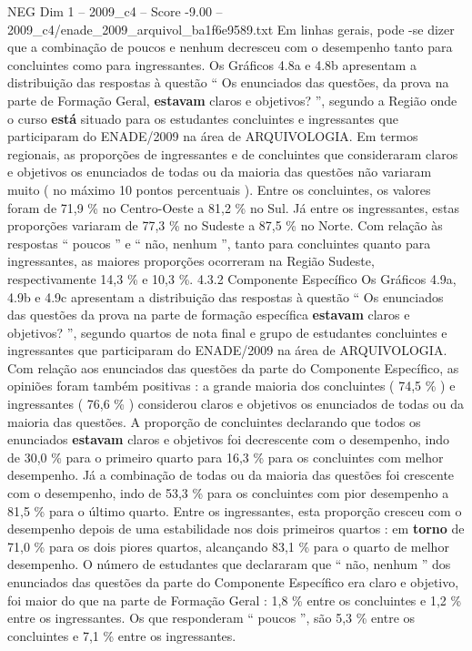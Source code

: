 \begin{textsample}{NEG Dim 1 – 2009\_c4 – Score -9.00 – 2009\_c4/enade\_2009\_arquivol\_ba1f6e9589.txt}
Em linhas gerais, pode -se dizer que a combinação de poucos e nenhum decresceu com o desempenho tanto para concluintes como para ingressantes.
Os Gráficos 4.8a e 4.8b apresentam a distribuição das respostas à questão “ Os enunciados das questões, da prova na parte de Formação Geral, \textbf{estavam} claros e objetivos? ”, segundo a Região onde o curso \textbf{está} situado para os estudantes concluintes e ingressantes que participaram do ENADE/2009 na área de ARQUIVOLOGIA.
Em termos regionais, as proporções de ingressantes e de concluintes que consideraram claros e objetivos os enunciados de todas ou da maioria das questões não variaram muito ( no máximo 10 pontos percentuais ).
Entre os concluintes, os valores foram de 71,9 \% no Centro-Oeste a 81,2 \% no Sul.
Já entre os ingressantes, estas proporções variaram de 77,3 \% no Sudeste a 87,5 \% no Norte.
Com relação às respostas “ poucos ” e “ não, nenhum ”, tanto para concluintes quanto para ingressantes, as maiores proporções ocorreram na Região Sudeste, respectivamente 14,3 \% e 10,3 \%. 4.3.2 Componente Específico Os Gráficos 4.9a, 4.9b e 4.9c apresentam a distribuição das respostas à questão “ Os enunciados das questões da prova na parte de formação específica \textbf{estavam} claros e objetivos? ”, segundo quartos de nota final e grupo de estudantes concluintes e ingressantes que participaram do ENADE/2009 na área de ARQUIVOLOGIA.
Com relação aos enunciados das questões da parte do Componente Específico, as opiniões foram também positivas : a grande maioria dos concluintes ( 74,5 \% ) e ingressantes ( 76,6 \% ) considerou claros e objetivos os enunciados de todas ou da maioria das questões.
A proporção de concluintes declarando que todos os enunciados \textbf{estavam} claros e objetivos foi decrescente com o desempenho, indo de 30,0 \% para o primeiro quarto para 16,3 \% para os concluintes com melhor desempenho.
Já a combinação de todas ou da maioria das questões foi crescente com o desempenho, indo de 53,3 \% para os concluintes com pior desempenho a 81,5 \% para o último quarto.
Entre os ingressantes, esta proporção cresceu com o desempenho depois de uma estabilidade nos dois primeiros quartos : em \textbf{torno} de 71,0 \% para os dois piores quartos, alcançando 83,1 \% para o quarto de melhor desempenho.
O número de estudantes que declararam que “ não, nenhum ” dos enunciados das questões da parte do Componente Específico era claro e objetivo, foi maior do que na parte de Formação Geral : 1,8 \% entre os concluintes e 1,2 \% entre os ingressantes.
Os que responderam “ poucos ”, são 5,3 \% entre os concluintes e 7,1 \% entre os ingressantes.

\end{textsample}
